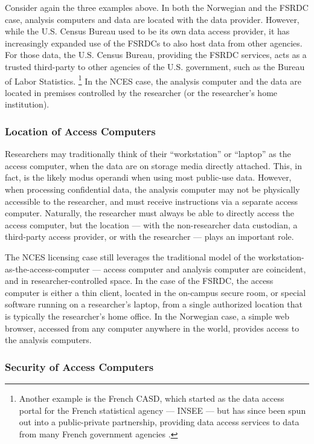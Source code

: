 Consider again the three examples above. In both the Norwegian and the FSRDC case, analysis computers and data are located with the data provider. However, while the U.S. Census Bureau used to be its own data access provider, it has increasingly expanded use of the \acp{FSRDC} to also host data from other agencies. For those data, the U.S. Census Bureau, providing the FSRDC services, acts as a trusted third-party to other agencies of the U.S. government, such as the Bureau of Labor Statistics.%
\footnote{Another example is the French \ac{CASD}, which started as the data access portal for the French statistical agency --- \ac{INSEE} --- but has since been spun out into a public-private partnership, providing data access services to data from many French government agencies \cite{SILBERMAN_2021}.} In the NCES case, the analysis computer and the data are located in premises controlled by the researcher (or the researcher's home institution).

\subsubsection{Location of Access Computers}

Researchers may traditionally think of their ``workstation'' or ``laptop'' as the access computer, when the data are on storage media directly attached. This, in fact, is the likely modus operandi when using most public-use data. However, when processing confidential data,  the analysis computer may not be physically accessible to the researcher, and must receive instructions via a separate access computer. Naturally, the researcher must always be able to directly access the access computer, but the location ---  with the non-researcher data custodian, a third-party access provider, or with the researcher --- plays an important role. 

The NCES licensing case still leverages the traditional model of the workstation-as-the-access-computer --- access computer and analysis computer are coincident, and in researcher-controlled space. In the case of the FSRDC, the access computer is either a thin client, located in the on-campus secure room, or special software running on a researcher's laptop, from a single authorized location that is typically the researcher's home office. In the Norwegian case, a simple web browser, accessed from any computer anywhere in the world, provides access to the analysis computers. 

\subsubsection{Security of Access Computers}

